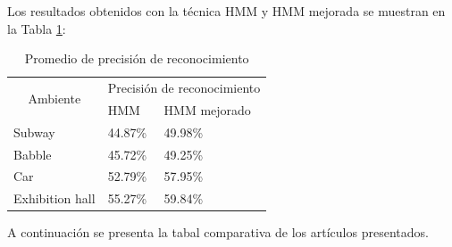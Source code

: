 	Los resultados obtenidos con la técnica HMM y HMM mejorada se muestran en la Tabla \ref{tb:hmm}:
	
	\begin{table}[H]
	\centering
	\caption{Promedio de precisión de reconocimiento}
	\label{tb:hmm}
	\begin{tabular}{|l|l|l|}
	\hline
	\multicolumn{1}{|c|}{\multirow{2}{*}{Ambiente}} & \multicolumn{2}{l|}{Precisión de reconocimiento} \\ \cline{2-3} 
	\multicolumn{1}{|c|}{}                          & HMM                  & HMM mejorado              \\ \hline
	Subway                                          & 44.87\%              & 49.98\%                   \\ \hline
	Babble                                          & 45.72\%              & 49.25\%                   \\ \hline
	Car                                             & 52.79\%              & 57.95\%                   \\ \hline
	Exhibition hall                                 & 55.27\%              & 59.84\%                   \\ \hline
	\end{tabular}
	\end{table}


	A continuación se presenta la tabal comparativa de los artículos presentados.
	
